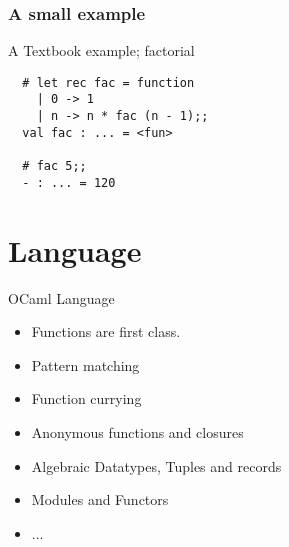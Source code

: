 \documentclass[xcolor=svgnames]{beamer}
\renewcommand{\_}{\mathunderscore}
\begin{document}



\begin{frame}[fragile]
  \frametitle{A small example}
  A Textbook example; factorial
  \begin{lstlisting}
  # let rec fac = function
    | 0 -> 1
    | n -> n * fac (n - 1);;
  val fac : ... = <fun>

  # fac 5;;
  - : ... = 120

  \end{lstlisting}
\end{frame}

\section{Language}
\begin{frame}
  OCaml Language
  \begin{itemize}
  \item Functions are first class.
  \item Pattern matching
  \item Function currying
  \item Anonymous functions and closures
  \item Algebraic Datatypes, Tuples and records
  \item Modules and Functors
  \item ...
  \end{itemize}
\end{frame}


\end{document}
